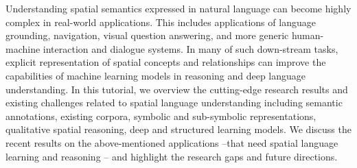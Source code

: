 Understanding spatial semantics expressed in natural language can become highly complex in real-world applications. This includes applications of language grounding, navigation, visual question answering, and more generic human-machine interaction and dialogue systems. In many of such down-stream tasks, explicit representation of spatial concepts and relationships can improve the capabilities of machine learning models in reasoning and deep language understanding. In this tutorial, we overview the cutting-edge research results and existing challenges related to spatial language understanding including semantic annotations, existing corpora, symbolic and sub-symbolic representations, qualitative spatial reasoning, deep and structured learning models.  We discuss the recent results on the above-mentioned applications --that need spatial language learning and reasoning -- and highlight the research gaps and future directions.

